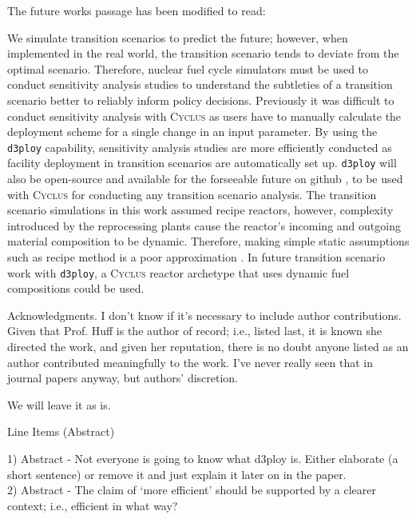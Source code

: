 \documentclass[answers,11pt]{exam}
\newcommand{\Cyclus}{\textsc{Cyclus}\xspace}%
\newcommand{\deploy}{\texttt{d3ploy}\xspace}%
\begin{document}
\begin{questions}
\begin{solution}
The future works passage has been modified to read: 

We simulate transition scenarios to predict the future; 
however, when implemented in the real world, the transition 
scenario tends to deviate from the optimal scenario.
Therefore, nuclear fuel cycle simulators must be used to conduct
sensitivity analysis studies to understand the subtleties of 
a transition scenario better to reliably inform policy decisions.
Previously it was difficult to conduct sensitivity analysis with \Cyclus 
as users have to manually calculate the deployment scheme for a 
single change in an input parameter. 
By using the \deploy capability,
sensitivity analysis studies are more efficiently 
conducted as facility deployment in transition scenarios 
are automatically set up. 
\deploy will also be open-source and available for the forseeable future on github 
\cite{chee_arfc/d3ploy:_2019}, to be used with \Cyclus for conducting any 
transition scenario analysis. 
The transition scenario simulations in this work assumed recipe reactors, 
however, complexity introduced by the reprocessing plants cause the reactor's 
incoming and outgoing material composition to be dynamic. Therefore, making simple static 
assumptions such as recipe method is a poor approximation 
\cite{bae_neural_2019,peterson-droogh_value_2018}. 
In future transition scenario work with \deploy, a \Cyclus 
reactor archetype that uses dynamic fuel compositions could be used. 
\end{solution}

\question Acknowledgments. I don’t know if it’s necessary to include author contributions. Given that Prof. Huff
is the author of record; i.e., listed last, it is known she directed the work, and given her reputation, there
is no doubt anyone listed as an author contributed meaningfully to the work. I’ve never really seen that
in journal papers anyway, but authors’ discretion.

\begin{solution}
        We will leave it as is. 
\end{solution}

\question Line Items (Abstract)

1) Abstract - Not everyone is going to know what d3ploy is. Either elaborate (a short sentence) or
remove it and just explain it later on in the paper. \\
2) Abstract - The claim of ‘more efficient’ should be supported by a clearer context; i.e., efficient in
what way?



\end{questions}
\end{document}
